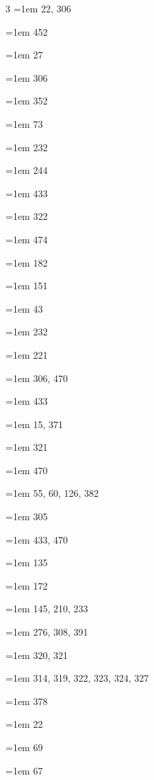 \begin{multicols}{3}
\hangindent=1em  22, 306\par
\hangindent=1em  452\par
\hangindent=1em  27\par
\hangindent=1em  306\par
\hangindent=1em  352\par
\hangindent=1em  73\par
\hangindent=1em  232\par
\hangindent=1em  244\par
\hangindent=1em  433\par
\hangindent=1em  322\par
\hangindent=1em  474\par
\hangindent=1em  182\par
\hangindent=1em  151\par
\hangindent=1em  43\par
\hangindent=1em  232\par
\hangindent=1em  221\par
\hangindent=1em  306, 470\par
\hangindent=1em  433\par
\hangindent=1em  15, 371\par
\hangindent=1em  321\par
\hangindent=1em  470\par
\hangindent=1em  55, 60, 126, 382\par
\hangindent=1em  305\par
\hangindent=1em  433, 470\par
\hangindent=1em  135\par
\hangindent=1em  172\par
\hangindent=1em  145, 210, 233\par
\hangindent=1em  276, 308, 391\par
\hangindent=1em  320, 321\par
\hangindent=1em  314, 319, 322, 323, 324, 327\par
\hangindent=1em  378\par
\hangindent=1em  22\par
\hangindent=1em  69\par
\hangindent=1em  67\par

\end{multicols}
